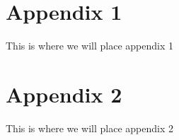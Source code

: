 \documentclass[12pt,a4paper,twoside,openright]{report}
\begin{document}
\cleardoublepage
{}



\cleardoublepage
\begin{appendices}
    \setcounter{page}{1}
    \chapter{Appendix 1}
        This is where we will place appendix 1
    
    \chapter{Appendix 2}
        This is where we will place appendix 2
\end{appendices}
\end{document}
